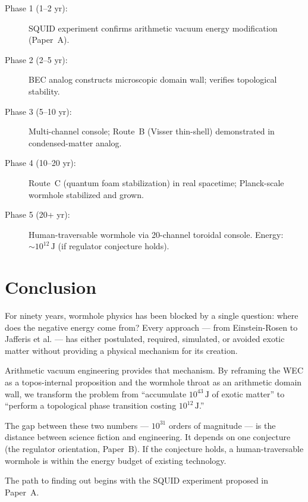\documentclass[11pt,a4paper]{article}
\begin{document}
\begin{description}
\item[Phase 1 (1--2 yr):] SQUID experiment confirms arithmetic
  vacuum energy modification (Paper~A).
\item[Phase 2 (2--5 yr):] BEC analog constructs microscopic
  domain wall; verifies topological stability.
\item[Phase 3 (5--10 yr):] Multi-channel console; Route~B
  (Visser thin-shell) demonstrated in condensed-matter analog.
\item[Phase 4 (10--20 yr):] Route~C (quantum foam stabilization)
  in real spacetime; Planck-scale wormhole stabilized and grown.
\item[Phase 5 (20+ yr):] Human-traversable wormhole via 20-channel
  toroidal console. Energy: $\sim 10^{12}\,\mathrm{J}$
  (if regulator conjecture holds).
\end{description}

\section{Conclusion}

For ninety years, wormhole physics has been blocked by a single
question: where does the negative energy come from? Every approach
--- from Einstein-Rosen to Jafferis et al. --- has either
postulated, required, simulated, or avoided exotic matter without
providing a physical mechanism for its creation.

Arithmetic vacuum engineering provides that mechanism. By reframing
the WEC as a topos-internal proposition and the wormhole throat as
an arithmetic domain wall, we transform the problem from
``accumulate $10^{43}\,\mathrm{J}$ of exotic matter'' to
``perform a topological phase transition costing $10^{12}\,\mathrm{J}$.''

The gap between these two numbers --- $10^{31}$ orders of
magnitude --- is the distance between science fiction and
engineering. It depends on one conjecture (the regulator
orientation, Paper~B). If the conjecture holds, a human-traversable
wormhole is within the energy budget of existing technology.

The path to finding out begins with the SQUID experiment
proposed in Paper~A.
\end{document}
